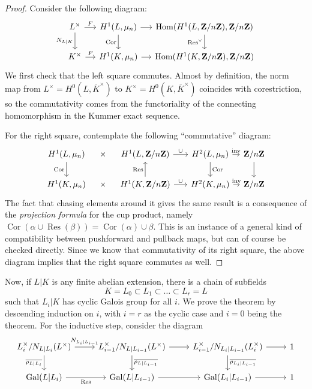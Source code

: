 \documentclass{article}
\begin{document}
\begin{proof}
		Consider the following diagram:
		\[
			\begin{tikzcd}[column sep=small]
						L^\times \arrow[r, "F"] \arrow[d, "N_{L|K}"']
						& H^1(L,\mu_n) \arrow[r] \arrow[d, "\operatorname{Cor}"']
						& \Hom(H^1(L,\Z/n\Z),\Z/n\Z) \arrow[d, "\operatorname{Res}^{\vee}"'] \\
						K^\times \arrow[r, "F"]
						& H^1(K,\mu_n) \arrow[r]
						& \Hom(H^1(K,\Z/n\Z),\Z/n\Z)
			\end{tikzcd}
		\]
		We first check that the left square commutes. Almost by definition, the norm map from $L^\times=H^0(L,\overline{K}^\times)$ to $K^\times=H^0(K,\overline{K}^\times)$ coincides with corestriction, so the commutativity comes from the functoriality of the connecting homomorphism in the Kummer exact sequence.

		For the right square, contemplate the following ``commutative'' diagram:
		\[
\begin{tikzcd}[column sep=0.8em]
H^1(L,\mu_n)
  \arrow[d, "\operatorname{Cor}"']
&
\times
&
H^1(L,\Z/n\Z)
	\arrow[rr, "\cup"]
&
&
H^2(L,\mu_n)
  \arrow[r, "\operatorname{inv}"]
	\arrow[d, "\operatorname{Cor}"]
&
\Z/n\Z
  \arrow[d]
\\
H^1(K,\mu_n)
&
\times
&
H^1(K,\Z/n\Z)
  \arrow[u, "\operatorname{Res}"]
	\arrow[rr, "\cup"]
&
&
H^2(K,\mu_n)
  \arrow[r, "\operatorname{inv}"]
&
\Z/n\Z
\end{tikzcd}
\]
The fact that chasing elements around it gives the same result is a consequence of the \textit{projection formula} for the cup product, namely $\operatorname{Cor}(\alpha\cup \operatorname{Res}(\beta)) = \operatorname{Cor}(\alpha)\cup \beta$. This is an instance of a general kind of compatibility between pushforward and pullback maps, but can of course be checked directly. Since we know that commutativity of its right square, the above diagram implies that the right square commutes as well.
\end{proof}
Now, if $L|K$ is any finite abelian extension, there is a chain of subfields
\[
	K = L_0 \subset L_1 \subset \ldots \subset L_r = L
\]
such that $L_i|K$ has cyclic Galois group for all $i$. We prove the theorem by descending induction on $i$, with $i=r$ as the cyclic case and $i=0$ being the theorem. For the inductive step, consider the diagram
\[
	\begin{tikzcd}
			L_i^\times/N_{L|L_i}(L^\times) \arrow[r, "N_{L_i|L_{i-1}}"] \arrow[d, "\overline{\rho_{L|L_i}}"'] & L_{i-1}^\times/N_{L|L_{i-1}}(L^\times) \arrow[d, "\overline{\rho_{L|L_{i-1}}}"] \arrow[r] & L_{i-1}^\times/N_{L_i|L_{i-1}}(L_i^\times) \arrow[d, "\overline{\rho_{L_i|L_{i-1}}}"] \ar[r] & 1 \\
			\Gal(L|L_i) \arrow[r, "\operatorname{Res}"'] & \Gal(L|L_{i-1})  \arrow[r] & \Gal(L_i|L_{i-1}) \arrow[r] & 1
	\end{tikzcd}
\]
\end{document}
